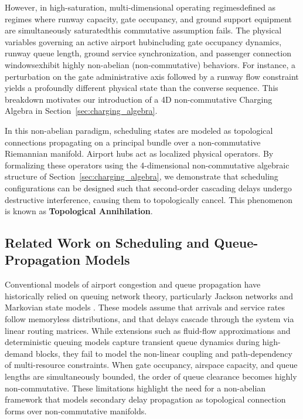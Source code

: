 \documentclass[11pt,a4paper]{book}
\begin{document}
However, in high-saturation, multi-dimensional operating regimesdefined as regimes where runway capacity, gate occupancy, and ground support equipment are simultaneously saturatedthis commutative assumption fails. The physical variables governing an active airport hubincluding gate occupancy dynamics, runway queue length, ground service synchronization, and passenger connection windowsexhibit highly non-abelian (non-commutative) behaviors. For instance, a perturbation on the gate administrative axis followed by a runway flow constraint yields a profoundly different physical state than the converse sequence. This breakdown motivates our introduction of a 4D non-commutative Charging Algebra in Section~\ref{sec:charging_algebra}.

In this non-abelian paradigm, scheduling states are modeled as topological connections propagating on a principal bundle over a non-commutative Riemannian manifold. Airport hubs act as localized physical operators. By formalizing these operators using the 4-dimensional non-commutative algebraic structure of Section~\ref{sec:charging_algebra}, we demonstrate that scheduling configurations can be designed such that second-order cascading delays undergo destructive interference, causing them to topologically cancel. This phenomenon is known as \textbf{Topological Annihilation}.

\subsection{Related Work on Scheduling and Queue-Propagation Models}

Conventional models of airport congestion and queue propagation have historically relied on queuing network theory, particularly Jackson networks and Markovian state models \cite{jackson1957, markov1906}. These models assume that arrivals and service rates follow memoryless distributions, and that delays cascade through the system via linear routing matrices. While extensions such as fluid-flow approximations and deterministic queuing models capture transient queue dynamics during high-demand blocks, they fail to model the non-linear coupling and path-dependency of multi-resource constraints. When gate occupancy, airspace capacity, and queue lengths are simultaneously bounded, the order of queue clearance becomes highly non-commutative. These limitations highlight the need for a non-abelian framework that models secondary delay propagation as topological connection forms over non-commutative manifolds.
\end{document}
